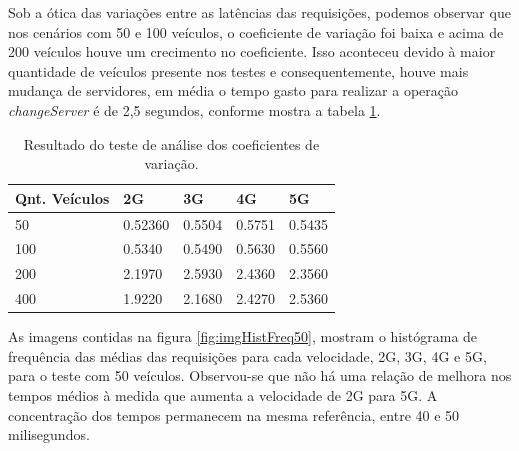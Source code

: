 \documentclass[
	12pt,				%
	oneside,			%
	a4paper,			%
	english,			%
	brazil				%
	]{abntex2ppgsi}
\begin{document}
Sob a ótica das variações entre as latências das requisições, podemos observar que nos cenários com 50 e 100 veículos, o coeficiente de variação foi baixa e acima de 200 veículos houve um crecimento no coeficiente. Isso aconteceu devido à maior quantidade de veículos presente nos testes e consequentemente, houve mais mudança de servidores, em média o tempo gasto para realizar a operação \textit{changeServer} é de 2,5 segundos, conforme mostra a tabela \ref{tbEstatisticaVariacoes}.

\begin{table}[!h]
	\centering
	\caption{Resultado do teste de análise dos coeficientes de variação.}
	\label{tbEstatisticaVariacoes}
	\begin{tabular}{|p{4.0cm}|p{2.0cm}|p{2.0cm}|p{2.0cm}|p{2.0cm}|}
		\hline
		\rowcolor[gray]{0.7}
		Qnt. Veículos & 2G      & 3G     & 4G     & 5G      \\ \hline
		\cellcolor[gray]{0.7}50              & 0.52360 & 0.5504 & 0.5751 & 0.5435 \\ \hline
		\cellcolor[gray]{0.7}100             & 0.5340  & 0.5490 & 0.5630 & 0.5560  \\ \hline
		\cellcolor[gray]{0.7}200             & 2.1970  & 2.5930 & 2.4360 & 2.3560  \\ \hline
		\cellcolor[gray]{0.7}400             & 1.9220  & 2.1680 & 2.4270 & 2.5360  \\ \hline
	\end{tabular}
\end{table}

As imagens contidas na figura \ref{fig:imgHistFreq50}, mostram o histógrama de frequência das médias das requisições para cada velocidade, 2G, 3G, 4G e 5G, para o teste com 50 veículos. Observou-se que não há uma relação de melhora nos tempos médios à medida que aumenta a velocidade de 2G para 5G.  A concentração dos tempos permanecem na mesma referência, entre 40 e 50 milisegundos.
\end{document}
